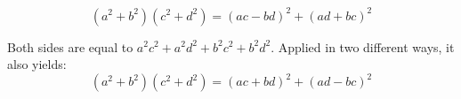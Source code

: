 $$(a^2 + b^2)(c^2 + d^2) = (ac - bd)^2 + (ad + bc)^2$$

Both sides are equal to $a^2c^2 + a^2d^2 + b^2c^2 + b^2d^2$. Applied in two different ways, it also yields:
$$(a^2 + b^2)(c^2 + d^2) = (ac + bd)^2 + (ad - bc)^2$$
